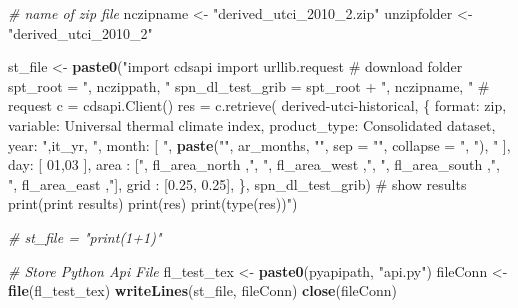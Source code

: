 \documentclass[
]{book}
\newenvironment{Shaded}{\begin{snugshade}}{\end{snugshade}}
\newcommand{\CommentTok}[1]{\textcolor[rgb]{0.56,0.35,0.01}{\textit{#1}}}
\newcommand{\DataTypeTok}[1]{\textcolor[rgb]{0.13,0.29,0.53}{#1}}
\newcommand{\KeywordTok}[1]{\textcolor[rgb]{0.13,0.29,0.53}{\textbf{#1}}}
\newcommand{\NormalTok}[1]{#1}
\newcommand{\StringTok}[1]{\textcolor[rgb]{0.31,0.60,0.02}{#1}}
\begin{document}
\begin{Shaded}
\begin{Highlighting}[]
    \CommentTok{\# name of zip file}
\NormalTok{    nczipname \textless{}{-}}\StringTok{ "derived\_utci\_2010\_2.zip"}
\NormalTok{    unzipfolder \textless{}{-}}\StringTok{ "derived\_utci\_2010\_2"}

\NormalTok{    st\_file \textless{}{-}}\StringTok{ }\KeywordTok{paste0}\NormalTok{(}\StringTok{"import cdsapi}
\StringTok{import urllib.request}
\StringTok{\# download folder}
\StringTok{spt\_root = \textquotesingle{}"}\NormalTok{, nczippath, }\StringTok{"\textquotesingle{}}
\StringTok{spn\_dl\_test\_grib = spt\_root + \textquotesingle{}"}\NormalTok{, nczipname, }\StringTok{"\textquotesingle{}}
\StringTok{\# request}
\StringTok{c = cdsapi.Client()}
\StringTok{res = c.retrieve(}
\StringTok{    \textquotesingle{}derived{-}utci{-}historical\textquotesingle{},}
\StringTok{    \{}
\StringTok{        \textquotesingle{}format\textquotesingle{}: \textquotesingle{}zip\textquotesingle{},}
\StringTok{        \textquotesingle{}variable\textquotesingle{}: \textquotesingle{}Universal thermal climate index\textquotesingle{},}
\StringTok{        \textquotesingle{}product\_type\textquotesingle{}: \textquotesingle{}Consolidated dataset\textquotesingle{},}
\StringTok{        \textquotesingle{}year\textquotesingle{}: \textquotesingle{}"}\NormalTok{,it\_yr, }\StringTok{"\textquotesingle{},}
\StringTok{        \textquotesingle{}month\textquotesingle{}: [}
\StringTok{            "}\NormalTok{, }\KeywordTok{paste}\NormalTok{(}\StringTok{"\textquotesingle{}"}\NormalTok{, ar\_months, }\StringTok{"\textquotesingle{}"}\NormalTok{, }\DataTypeTok{sep =} \StringTok{""}\NormalTok{, }\DataTypeTok{collapse =} \StringTok{", "}\NormalTok{), }\StringTok{"}
\StringTok{        ],}
\StringTok{        \textquotesingle{}day\textquotesingle{}: [}
\StringTok{            \textquotesingle{}01\textquotesingle{},\textquotesingle{}03\textquotesingle{}}
\StringTok{        ],}
\StringTok{        \textquotesingle{}area\textquotesingle{}  : ["}\NormalTok{, fl\_area\_north ,}\StringTok{", "}\NormalTok{, fl\_area\_west ,}\StringTok{", "}\NormalTok{, fl\_area\_south ,}\StringTok{", "}\NormalTok{, fl\_area\_east ,}\StringTok{"],}
\StringTok{        \textquotesingle{}grid\textquotesingle{}  : [0.25, 0.25],}
\StringTok{    \},}
\StringTok{    spn\_dl\_test\_grib)}
\StringTok{\# show results}
\StringTok{print(\textquotesingle{}print results\textquotesingle{})}
\StringTok{print(res)}
\StringTok{print(type(res))"}\NormalTok{)}

    \CommentTok{\# st\_file = "print(1+1)"}

    \CommentTok{\# Store Python Api File}
\NormalTok{    fl\_test\_tex \textless{}{-}}\StringTok{ }\KeywordTok{paste0}\NormalTok{(pyapipath, }\StringTok{"api.py"}\NormalTok{)}
\NormalTok{    fileConn \textless{}{-}}\StringTok{ }\KeywordTok{file}\NormalTok{(fl\_test\_tex)}
    \KeywordTok{writeLines}\NormalTok{(st\_file, fileConn)}
    \KeywordTok{close}\NormalTok{(fileConn)}


\end{Highlighting}
\end{Shaded}
\end{document}
